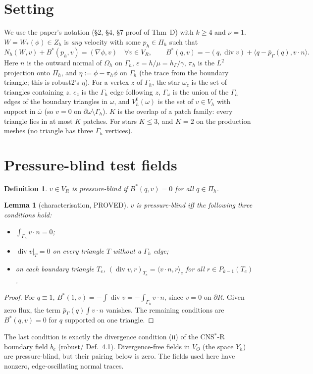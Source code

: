 \documentclass[11pt]{article}
\newtheorem{lemma}[theorem]{Lemma}
\newtheorem{definition}[theorem]{Definition}
\theoremstyle{remark}
\newcommand{\hG}{h_\Gamma}
\newcommand{\Gh}{\Gamma_h}
\newcommand{\ip}[2]{\langle #1,#2\rangle}
\begin{document}
\section{Setting}
We use the paper's notation (§2, §4, §7 proof of Thm~D) with $k\ge4$ and $\nu=1$. $W=W_\ast(\phi)\in Z_h$ is \emph{any} velocity
with some $p_h\in\Pi_h$ such that
\[
N_h(W,v)+B^\ast(p_h,v)=(\nabla\phi,v)\quad\forall v\in V_R,\qquad
B^\ast(q,v)=-(q,\operatorname{div}v)+\ip{q-\bar p_\Gamma(q)}{v\cdot n}.
\]
Here $n$ is the outward normal of $\Omega_h$ on $\Gh$, $\varepsilon=h/\mu=\hG/\gamma$, $\pi_h$ is the $L^2$ projection onto
$\Pi_h$, and $\eta:=\phi-\pi_h\phi$ on $\Gh$ (the trace from the boundary triangle; this is robust2's $\eta$). For a vertex
$z$ of $\Gh$, the star $\omega_z$ is the set of triangles containing $z$. $e_z$ is the $\Gh$ edge following $z$, $\Gamma_\omega$ is the
union of the $\Gh$ edges of the boundary triangles in $\omega$, and $V_h^0(\omega)$ is the set of $v\in V_h$ with support in
$\overline\omega$ (so $v=0$ on $\partial\omega\setminus\Gh$). $K$ is the overlap of a patch family: every triangle lies in at
most $K$ patches. For stars $K\le3$, and $K=2$ on the production meshes (no triangle has three $\Gh$ vertices).

\section{Pressure-blind test fields}
\begin{definition}
$v\in V_R$ is \emph{pressure-blind} if $B^\ast(q,v)=0$ for all $q\in\Pi_h$.
\end{definition}

\begin{lemma}[characterisation, PROVED]\label{lem:char}
$v$ is pressure-blind iff the following three conditions hold:
\begin{itemize}
\item $\int_{\Gh}v\cdot n=0$;
\item $\operatorname{div}v|_T=0$ on every triangle $T$ without a $\Gh$ edge;
\item on each boundary triangle $T_e$, $(\operatorname{div}v,r)_{T_e}=\ip{v\cdot n}{r}_e$ for all $r\in P_{k-1}(T_e)$.
\end{itemize}
\end{lemma}
\begin{proof}
For $q\equiv1$, $B^\ast(1,v)=-\int\operatorname{div}v=-\int_{\Gh}v\cdot n$, since $v=0$ on $\partial R$. Given zero flux, the term
$\bar p_\Gamma(q)\int v\cdot n$ vanishes. The remaining conditions are $B^\ast(q,v)=0$ for $q$ supported on one triangle.
\end{proof}
The last condition is exactly the divergence condition (ii) of the CNS$^\ast$-R boundary field $b_e$ (robust/ Def.~4.1).
Divergence-free fields in $V_O$ (the space $Y_h$) are pressure-blind, but their pairing below is zero. The fields used here have
nonzero, edge-oscillating normal traces.
\end{document}
